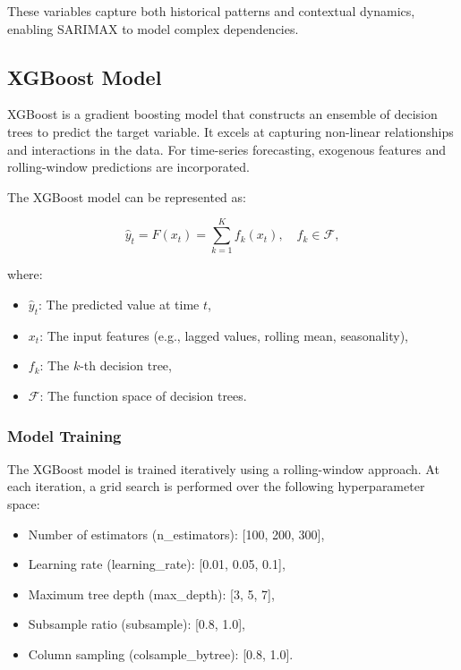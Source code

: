 \documentclass[journal]{IEEEtran}
\begin{document}
These variables capture both historical patterns and contextual dynamics, enabling SARIMAX to model complex dependencies.

\subsection{XGBoost Model}
XGBoost is a gradient boosting model that constructs an ensemble of decision trees to predict the target variable. It excels at capturing non-linear relationships and interactions in the data. For time-series forecasting, exogenous features and rolling-window predictions are incorporated.

The XGBoost model can be represented as:

\begin{equation}
\hat{y}_{t}=F(x_{t})=\sum_{k=1}^{K}f_{k}(x_{t}),\quad f_{k}\in\mathcal{F},
\end{equation}

where:
\begin{itemize}
    \item \(\hat{y}_{t}\): The predicted value at time \(t\),
    \item \(x_{t}\): The input features (e.g., lagged values, rolling mean, seasonality),
    \item \(f_{k}\): The \(k\)-th decision tree,
    \item \(\mathcal{F}\): The function space of decision trees.
\end{itemize}

\subsubsection{Model Training}
The XGBoost model is trained iteratively using a rolling-window approach. At each iteration, a grid search is performed over the following hyperparameter space:

\begin{itemize}
    \item Number of estimators (n\_estimators): [100, 200, 300],
    \item Learning rate (learning\_rate): [0.01, 0.05, 0.1],
    \item Maximum tree depth (max\_depth): [3, 5, 7],
    \item Subsample ratio (subsample): [0.8, 1.0],
    \item Column sampling (colsample\_bytree): [0.8, 1.0].
\end{itemize}
\end{document}
